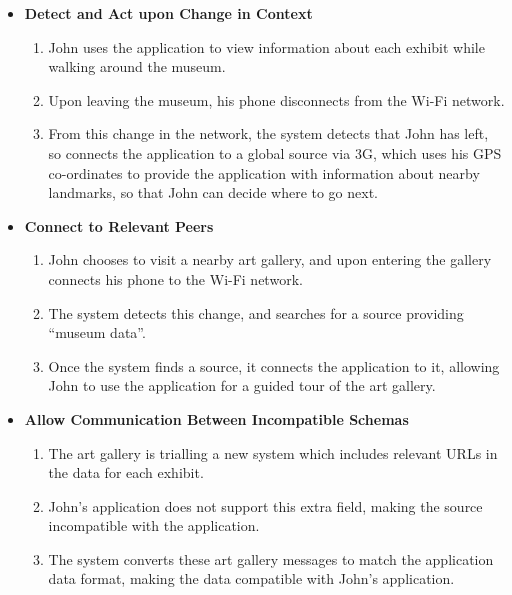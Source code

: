 \documentclass[12pt,twoside,notitlepage]{report}
\begin{document}
\begin{itemize}

\item {\bf Detect and Act upon Change in Context}

\begin{enumerate}

\item John uses the application to view information about each exhibit while walking around the museum.

\item Upon leaving the museum, his phone disconnects from the Wi-Fi network.

\item From this change in the network, the system detects that John has left, so connects the application to a global source via 3G, which uses his GPS co-ordinates to provide the application with information about nearby landmarks, so that John can decide where to go next. 

\end{enumerate}

\item {\bf Connect to Relevant Peers}

\begin{enumerate}

\item John chooses to visit a nearby art gallery, and upon entering the gallery connects his phone to the Wi-Fi network.

\item The system detects this change, and searches for a source providing ``museum data''.

\item Once the system finds a source, it connects the application to it, allowing John to use the application for a guided tour of the art gallery. 

\end{enumerate}

\item {\bf Allow Communication Between Incompatible Schemas}

\begin{enumerate}

\item The art gallery is trialling a new system which includes relevant URLs in the data for each exhibit.  

\item John's application does not support this extra field, making the source incompatible with the application.

\item The system converts these art gallery messages to match the application data format, making the data compatible with John's application. 

\end{enumerate}

\end{itemize}
\end{document}
